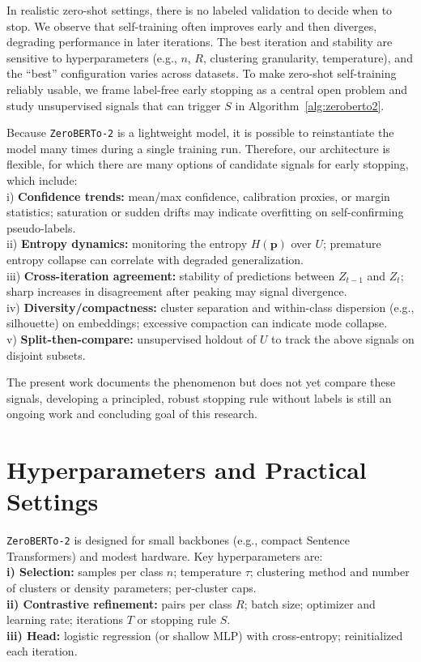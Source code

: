 \documentclass[]{politex-xico}
\begin{document}
In realistic zero-shot settings, there is no labeled validation to decide when to stop. We observe that self-training often improves early and then diverges, degrading performance in later iterations.
The best iteration and stability are sensitive to hyperparameters (e.g., $n$, $R$, clustering granularity, temperature), and the “best” configuration varies across datasets.
To make zero-shot self-training reliably usable, we frame label-free early stopping as a central open problem and study unsupervised signals that can trigger $S$ in Algorithm~\ref{alg:zeroberto2}. 

Because \texttt{ZeroBERTo-2} is a lightweight model, it is possible to reinstantiate the model many times during a single training run. Therefore, our architecture is flexible, for which there are many options of candidate signals for early stopping, which include:\\
i) \textbf{Confidence trends:} mean/max confidence, calibration proxies, or margin statistics; saturation or sudden drifts may indicate overfitting on self-confirming pseudo-labels. \\
ii) \textbf{Entropy dynamics:} monitoring the entropy $H(\mathbf{p})$ over $U$; premature entropy collapse can correlate with degraded generalization. \\
iii) \textbf{Cross-iteration agreement:} stability of predictions between $Z_{t-1}$ and $Z_t$; sharp increases in disagreement after peaking may signal divergence. \\
iv) \textbf{Diversity/compactness: }cluster separation and within-class dispersion (e.g., silhouette) on embeddings; excessive compaction can indicate mode collapse. \\
v) \textbf{Split-then-compare:} unsupervised holdout of $U$ to track the above signals on disjoint subsets.

The present work documents the phenomenon but does not yet compare these signals, developing a principled, robust stopping rule without labels is still an ongoing work and concluding goal of this research.

\section{Hyperparameters and Practical Settings}
\label{sec:hparams}

\texttt{ZeroBERTo-2} is designed for small backbones (e.g., compact Sentence Transformers) and modest hardware. Key hyperparameters are:\\
\textbf{i) Selection:} samples per class $n$; temperature $\tau$; clustering method and number of clusters or density parameters; per-cluster caps.\\
\textbf{ii) Contrastive refinement:} pairs per class $R$; batch size; optimizer and learning rate; iterations $T$ or stopping rule $S$.\\
\textbf{iii) Head: }logistic regression (or shallow MLP) with cross-entropy; reinitialized each iteration.
\end{document}
